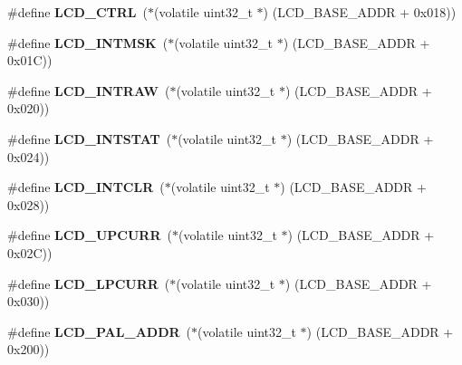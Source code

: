\begin{DoxyCompactItemize}
\#define {\bfseries L\+C\+D\+\_\+\+C\+T\+RL}~($\ast$(volatile uint32\+\_\+t $\ast$) (L\+C\+D\+\_\+\+B\+A\+S\+E\+\_\+\+A\+D\+DR + 0x018))
\item 
\mbox{\label{group__lpc24xx__regs_gaf5f7d966204ae861cb3a36b67c29d6fc}} 
\#define {\bfseries L\+C\+D\+\_\+\+I\+N\+T\+M\+SK}~($\ast$(volatile uint32\+\_\+t $\ast$) (L\+C\+D\+\_\+\+B\+A\+S\+E\+\_\+\+A\+D\+DR + 0x01\+C))
\item 
\mbox{\label{group__lpc24xx__regs_gab7ece4f17be49f678d13fa326dfad651}} 
\#define {\bfseries L\+C\+D\+\_\+\+I\+N\+T\+R\+AW}~($\ast$(volatile uint32\+\_\+t $\ast$) (L\+C\+D\+\_\+\+B\+A\+S\+E\+\_\+\+A\+D\+DR + 0x020))
\item 
\mbox{\label{group__lpc24xx__regs_ga6e6f9aa2bca3a1d28096d98c4d22d136}} 
\#define {\bfseries L\+C\+D\+\_\+\+I\+N\+T\+S\+T\+AT}~($\ast$(volatile uint32\+\_\+t $\ast$) (L\+C\+D\+\_\+\+B\+A\+S\+E\+\_\+\+A\+D\+DR + 0x024))
\item 
\mbox{\label{group__lpc24xx__regs_ga7697b2ff4ab0659d55609a17725e4e48}} 
\#define {\bfseries L\+C\+D\+\_\+\+I\+N\+T\+C\+LR}~($\ast$(volatile uint32\+\_\+t $\ast$) (L\+C\+D\+\_\+\+B\+A\+S\+E\+\_\+\+A\+D\+DR + 0x028))
\item 
\mbox{\label{group__lpc24xx__regs_gaa8a9ffa0424b7f33b6eac4e25c42986f}} 
\#define {\bfseries L\+C\+D\+\_\+\+U\+P\+C\+U\+RR}~($\ast$(volatile uint32\+\_\+t $\ast$) (L\+C\+D\+\_\+\+B\+A\+S\+E\+\_\+\+A\+D\+DR + 0x02\+C))
\item 
\mbox{\label{group__lpc24xx__regs_ga7f0d3a8dec8e5e55adca0a37ed98e259}} 
\#define {\bfseries L\+C\+D\+\_\+\+L\+P\+C\+U\+RR}~($\ast$(volatile uint32\+\_\+t $\ast$) (L\+C\+D\+\_\+\+B\+A\+S\+E\+\_\+\+A\+D\+DR + 0x030))
\item 
\mbox{\label{group__lpc24xx__regs_gaa5f43cea07a22ad4c2221b10d1faa0d1}} 
\#define {\bfseries L\+C\+D\+\_\+\+P\+A\+L\+\_\+\+A\+D\+DR}~($\ast$(volatile uint32\+\_\+t $\ast$) (L\+C\+D\+\_\+\+B\+A\+S\+E\+\_\+\+A\+D\+DR + 0x200))
\item 
\mbox{\label{group__lpc24xx__regs_gac135d694287a84c4491966320dd80f32}} 

\end{DoxyCompactItemize}
